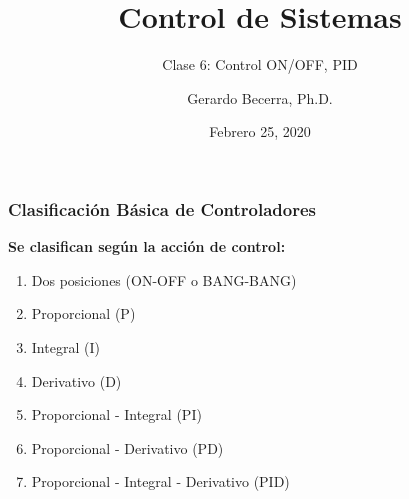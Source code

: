 \documentclass[aspectratio=169,handout]{beamer}
\title{Control de Sistemas}
\subtitle{\small Clase 6: Control ON/OFF, PID}
\author{Gerardo Becerra, Ph.D.}
\institute{Pontificia Universidad Javeriana\\ Departamento de Electrónica}
\date{Febrero 25, 2020}
\theoremstyle{definition}
\theoremstyle{plain}
\theoremstyle{remark}
\begin{document}
\frame{\titlepage}	


\begin{frame}[<+->]\frametitle{Clasificación Básica de Controladores}
\textbf{Se clasifican según la acción de control:}\\
\begin{enumerate}
  \item Dos posiciones (ON-OFF o BANG-BANG)
  \item Proporcional (P)
  \item Integral (I)
  \item Derivativo (D)
  \item Proporcional - Integral (PI)
  \item Proporcional - Derivativo (PD)
  \item Proporcional - Integral - Derivativo (PID)
\end{enumerate}
\end{frame}
\end{document}
